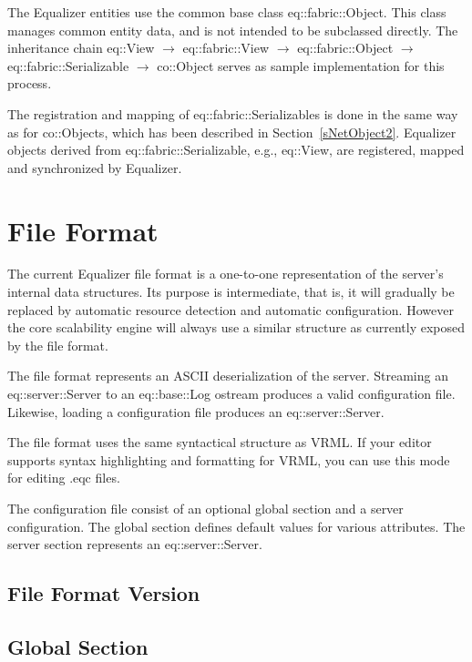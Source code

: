 \documentclass[10pt,a4]{scrartcl}
\newcommand{\sref}[1]{Section~\ref{#1}}
\begin{document}
The Equalizer entities use the common base class
\textsf{eq::fabric::Object}. This class manages common entity data, and is not
intended to be subclassed directly.  The inheritance chain \textsf{eq::View}
$\rightarrow$ \textsf{eq::fabric::View} $\rightarrow$
\textsf{eq::fabric::Object} $\rightarrow$ \textsf{eq::fabric::Se\-rial\-izable}
$\rightarrow$ \textsf{co::Object} serves as sample implementation for this
process.

The registration and mapping of \textsf{eq::fabric::Serializable}s is done in
the same way as for \textsf{co::Object}s, which has been described in
\sref{sNetObject2}. Equalizer objects derived from
\textsf{eq::fabric::Serializable}, e.g., \textsf{eq::View}, are registered,
mapped and synchronized by Equalizer.


\newpage
\appendix
\section{\label{aFileFormat}File Format}

The current Equalizer file format is a one-to-one representation of the
server's internal data structures. Its purpose is intermediate, that is,
it will gradually be replaced by automatic resource detection and
automatic configuration. However the core scalability engine will always
use a similar structure as currently exposed by the file format.

The file format represents an ASCII deserialization of the
server. Streaming an \textsf{eq::server::Server} to an \textsf{eq::base::Log}
ostream produces a valid configuration file. Likewise, loading a
configuration file produces an \textsf{eq::server::Server}.

The file format uses the same syntactical structure as VRML. If your
editor supports syntax highlighting and formatting for VRML, you can use
this mode for editing \textsf{.eqc} files.

The configuration file consist of an optional global section and a
server configuration. The global section defines default values for
various attributes. The server section represents an
\textsf{eq::server::Server}.


\subsection{File Format Version}

\subsection{\label{sGlobal}Global Section}
\end{document}
